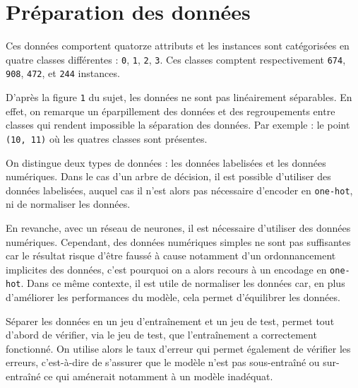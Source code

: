 \chapter{Préparation des données}

Ces données comportent quatorze attributs et les instances sont catégorisées en quatre classes différentes : \texttt{0}, \texttt{1}, \texttt{2}, \texttt{3}. Ces classes comptent respectivement \texttt{674}, \texttt{908}, \texttt{472}, et \texttt{244} instances.

D'après la figure \texttt{1} du sujet, les données ne sont pas linéairement séparables. En effet, on remarque un éparpillement des données et des regroupements entre classes qui rendent impossible la séparation des données. Par exemple : le point \texttt{(10, 11)} où les quatres classes sont présentes.

On distingue deux types de données : les données labelisées et les données numériques. Dans le cas d'un arbre de décision, il est possible d'utiliser des données labelisées, auquel cas il n'est alors pas nécessaire d'encoder en \texttt{one-hot}, ni de normaliser les données.

En revanche, avec un réseau de neurones, il est nécessaire d'utiliser des données numériques. Cependant, des données numériques simples ne sont pas suffisantes car le résultat risque d'être faussé à cause notamment d'un ordonnancement implicites des données, c'est pourquoi on a alors recours à un encodage en \texttt{one-hot}. Dans ce même contexte, il est utile de normaliser les données car, en plus d'améliorer les performances du modèle, cela permet d'équilibrer les données.

Séparer les données en un jeu d'entraînement et un jeu de test, permet tout d'abord de vérifier, via le jeu de test, que l'entraînement a correctement fonctionné. On utilise alors le taux d'erreur qui permet également de vérifier les erreurs, c'est-à-dire de s'assurer que le modèle n'est pas sous-entraîné ou sur-entraîné ce qui aménerait notamment à un modèle inadéquat.